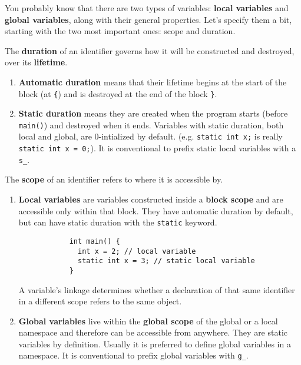 \documentclass{article}
\begin{document}
      You probably know that there are two types of variables: \textbf{local variables} and \textbf{global variables}, along with their general properties. Let's specify them a bit, starting with the two most important ones: scope and duration.  

      \begin{definition}[Duration]
        The \textbf{duration} of an identifier governs how it will be constructed and destroyed, over its \textbf{lifetime}. 
        \begin{enumerate}
          \item \textbf{Automatic duration} means that their lifetime begins at the start of the block (at \texttt{\{}) and is destroyed at the end of the block \texttt{\}}. 
          \item \textbf{Static duration} means they are created when the program starts (before \texttt{main()}) and destroyed when it ends. Variables with static duration, both local and global, are 0-intialized by default. (e.g. \texttt{static int x;} is really \texttt{static int x = 0;}). It is conventional to prefix static local variables with a \texttt{s\_}. 
        \end{enumerate}
      \end{definition} 

      \begin{definition}[Scope]
        The \textbf{scope} of an identifier refers to where it is accessible by. 
        \begin{enumerate}
          \item \textbf{Local variables} are variables constructed inside a \textbf{block scope} and are accessible only within that block. They have automatic duration by default, but can have static duration with the \texttt{static} keyword. 

          \begin{lstlisting}
            int main() {
              int x = 2; // local variable 
              static int x = 3; // static local variable
            }
          \end{lstlisting}
          A variable's linkage determines whether a declaration of that same identifier in a different scope refers to the same object. 

          \item \textbf{Global variables} live within the \textbf{global scope} of the global or a local namespace and therefore can be accessible from anywhere. They are static variables by definition. Usually it is preferred to define global variables in a namespace. It is conventional to prefix global variables with \texttt{g\_}. 
        \end{enumerate}
      \end{definition} 
\end{document}
